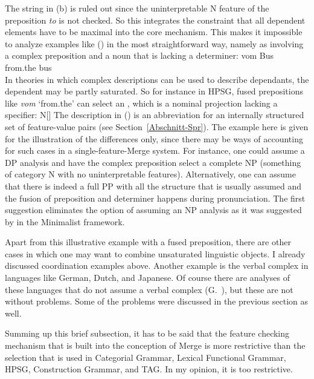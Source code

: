 \addlines[2]
The string in (b) is ruled out since the uninterpretable N feature of the preposition
\emph{to} is not checked. So this integrates the constraint that all
dependent elements have to be maximal into the core mechanism. This makes it impossible to analyze examples like ()
in the most straightforward way, namely as involving a complex preposition and a noun that is lacking
a determiner:
\ea
\gll vom Bus\\
     from.the bus\\
\z
In theories in which complex descriptions can be used to describe dependants, the dependent may be
partly saturated. So for instance in HPSG, fused prepositions like \emph{vom} `from.the' can select an \nbar,
which is a nominal projection lacking a specifier:
\ea
N[\spr {}]
\z
The description in () is an abbreviation for an internally structured set of feature-value
pairs (see Section~\ref{Abschnitt-Spr}). The example here is given for the illustration of the
differences only, since there may be ways of accounting for such cases in a single-feature-Merge
system. For instance, one could assume a DP analysis and have the complex preposition select a complete NP
(something of category N with no uninterpretable features). Alternatively, one can assume that there is indeed a full PP
with all the structure that is usually assumed and the fusion of preposition and determiner happens
during pronunciation. The first suggestion eliminates the option of assuming an NP analysis as it
was suggested by \citet{Bruening2009a} in the Minimalist framework.

Apart from this illustrative example with a fused preposition, there are other cases in which one may want to combine unsaturated
linguistic objects. I already discussed coordination examples above. Another example is the verbal
complex in languages like German, Dutch, 
and Japanese. 
Of course there are analyses of these languages
that do not assume a verbal complex (G.\ \citealp{GMueller98a,Wurmbrand2003b}), but these are not without problems. Some of the problems were
discussed in the previous section as well.

Summing up this brief subsection, it has to be said that the feature checking mechanism that is
built into the conception of Merge is more restrictive than the selection that is used in Categorial
Grammar, Lexical Functional Grammar, HPSG, Construction Grammar, and TAG. In my opinion, it is too restrictive.

